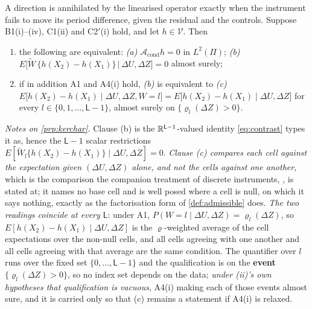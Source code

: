 \begin{proposition}\label{prp:kerchar}
A direction is annihilated by the linearised operator exactly when the instrument fails to move its
period difference, given the residual and the controls.
Suppose B1(i)--(iv), C1(ii) and C2$'$(i) hold, and let $h\in\mathcal V$. Then
\begin{enumerate}
\item[(i)] the following are equivalent:
\emph{(a)} $\mathcal A_{\mathrm{cond}}h=0$ in $L^{2}(\Pi)$;
\emph{(b)} $E\big[\widetilde W\,\{h(X_2)-h(X_1)\}\,\big|\,\Delta U,\Delta Z\big]=0$ almost surely;
\item[(ii)] if in addition A1 and A4(i) hold, \emph{(b)} is equivalent to
\emph{(c)} $E\big[h(X_2)-h(X_1)\mid\Delta U,\Delta Z,W=l\big]
=E\big[h(X_2)-h(X_1)\mid\Delta U,\Delta Z\big]$ for every $l\in\{0,1,\dots,\mathsf L-1\}$, almost
surely on $\{\varrho_l(\Delta Z)>0\}$.
\end{enumerate}
\end{proposition}

\noindent\emph{Notes on \cref{prp:kerchar}.} Clause \textup{(b)} is the $\mathbb{R}^{\mathsf L-1}$-valued
identity \eqref{eq:contrast} types it as, hence the $\mathsf L-1$ scalar restrictions
$E[\widetilde W_l\{h(X_2)-h(X_1)\}\mid\Delta U,\Delta Z]=0$. \emph{Clause \textup{(c)} compares each cell
against the expectation given $(\Delta U,\Delta Z)$ alone, and not the cells against one another}, which
is the comparison the companion treatment of discrete instruments,
\citet{centorrinofeveflorens2019}, is stated at; it names no base cell and is well posed where a cell is
null, on which it says nothing, exactly as the factorisation form of \cref{def:admissible} does.
\emph{The two readings coincide at every $\mathsf L$}: under A1,
$P(W=l\mid\Delta U,\Delta Z)=\varrho_l(\Delta Z)$, so $E[h(X_2)-h(X_1)\mid\Delta U,\Delta Z]$ is the
$\varrho$-weighted average of the cell expectations over the non-null cells, and all cells agreeing with
one another and all cells agreeing with that average are the same condition. The quantifier over $l$
runs over the fixed set $\{0,\dots,\mathsf L-1\}$ and the qualification is on the \textbf{event}
$\{\varrho_l(\Delta Z)>0\}$, so no index set depends on the data; \emph{under \textup{(ii)}'s own
hypotheses that qualification is vacuous}, A4(i) making each of those events almost sure, and it is
carried only so that \textup{(c)} remains a statement if A4(i) is relaxed.

